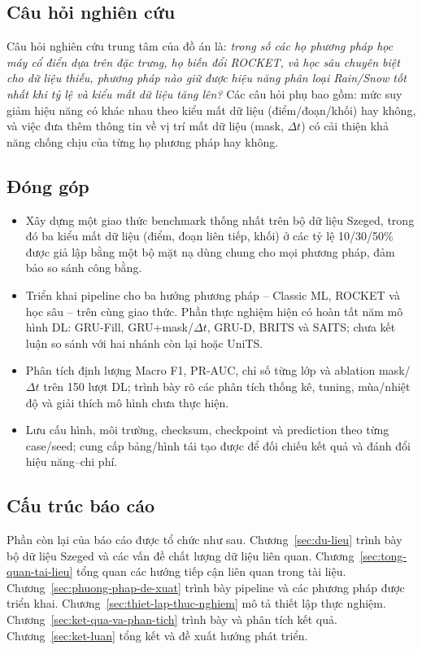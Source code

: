 \subsection{Câu hỏi nghiên cứu}
\label{sec:cau-hoi-nghien-cuu}

Câu hỏi nghiên cứu trung tâm của đồ án là: \emph{trong số các họ phương pháp học máy cổ
điển dựa trên đặc trưng, họ biến đổi ROCKET, và học sâu chuyên biệt cho dữ liệu thiếu,
phương pháp nào giữ được hiệu năng phân loại Rain/Snow tốt nhất khi tỷ lệ và kiểu mất dữ
liệu tăng lên?} Các câu hỏi phụ bao gồm: mức suy giảm hiệu năng có khác nhau theo kiểu
mất dữ liệu (điểm/đoạn/khối) hay không, và việc đưa thêm thông tin về vị trí mất dữ liệu
(mask, $\Delta t$) có cải thiện khả năng chống chịu của từng họ phương pháp hay không.

\subsection{Đóng góp}
\label{sec:dong-gop}

\begin{itemize}
  \item Xây dựng một giao thức benchmark thống nhất trên bộ dữ liệu Szeged, trong đó ba
        kiểu mất dữ liệu (điểm, đoạn liên tiếp, khối) ở các tỷ lệ 10/30/50\% được giả lập
        bằng một bộ mặt nạ dùng chung cho mọi phương pháp, đảm bảo so sánh công bằng.
  \item Triển khai pipeline cho ba hướng phương pháp -- Classic ML, ROCKET
        và học sâu -- trên cùng giao thức. Phần thực nghiệm hiện có hoàn tất
        năm mô hình DL: GRU-Fill, GRU+mask/$\Delta t$, GRU-D, BRITS và SAITS;
        chưa kết luận so sánh với hai nhánh còn lại hoặc UniTS.
  \item Phân tích định lượng Macro F1, PR-AUC, chỉ số từng lớp và ablation
        mask/$\Delta t$ trên 150 lượt DL; trình bày rõ các phân tích thống kê,
        tuning, mùa/nhiệt độ và giải thích mô hình chưa thực hiện.
  \item Lưu cấu hình, môi trường, checksum, checkpoint và prediction theo
        từng case/seed; cung cấp bảng/hình tái tạo được để đối chiếu kết quả
        và đánh đổi hiệu năng--chi phí.
\end{itemize}

\subsection{Cấu trúc báo cáo}
\label{sec:cau-truc-bao-cao}

Phần còn lại của báo cáo được tổ chức như sau. Chương~\ref{sec:du-lieu} trình bày bộ dữ
liệu Szeged và các vấn đề chất lượng dữ liệu liên quan. Chương~\ref{sec:tong-quan-tai-lieu}
tổng quan các hướng tiếp cận liên quan trong tài liệu. Chương~\ref{sec:phuong-phap-de-xuat}
trình bày pipeline và các phương pháp được triển khai. Chương~\ref{sec:thiet-lap-thuc-nghiem}
mô tả thiết lập thực nghiệm. Chương~\ref{sec:ket-qua-va-phan-tich} trình bày và phân tích
kết quả. Chương~\ref{sec:ket-luan} tổng kết và đề xuất hướng phát triển.
